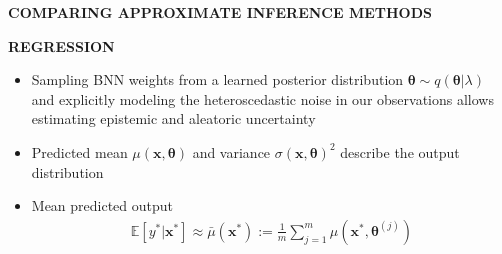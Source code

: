 \begin{whitebox}{\textbf{COMPARING APPROXIMATE INFERENCE METHODS}}
    \begin{center}
    \end{center}
\end{whitebox}

\begin{whitebox}{\textbf{REGRESSION}}
    \begin{itemize}
        \item Sampling BNN weights from a learned posterior distribution $\bm{\theta}\sim q(\bm{\theta}|\lambda)$ and explicitly modeling the heteroscedastic noise in our observations allows estimating epistemic and aleatoric uncertainty
        \item Predicted mean $\mu(\bm{x},\bm{\theta})$ and variance $\sigma(\bm{x},\bm{\theta})^2$ describe the output distribution
        \item Mean predicted output
        \begin{align*}
            \mathbb{E}[y^*|\bm{x}^*]\approx\bar{\mu}(\bm{x}^*):=\frac{1}{m}\sum_{j=1}^m\mu\left(\bm{x}^*,\bm{\theta}^{(j)}\right)
        \end{align*}
        \begin{center}
        \end{center}
    \end{itemize}
\end{whitebox}